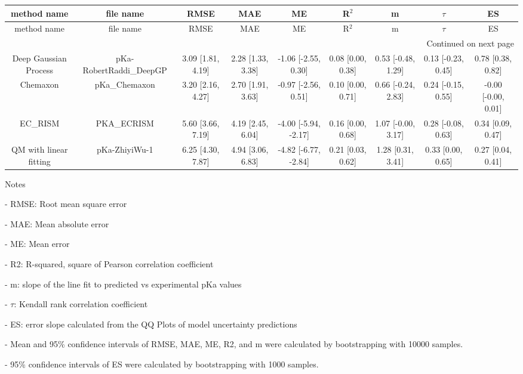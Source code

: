 \documentclass{article}
\begin{document}
\begin{center}
\scriptsize
\begin{longtable}{|ccccccccc|}
\toprule
           method name &               file name &              RMSE &               MAE &                   ME &             R$^2$ &                  m &             $\tau$ &                  ES \\
\midrule
\endfirsthead

\toprule
           method name &               file name &              RMSE &               MAE &                   ME &             R$^2$ &                  m &             $\tau$ &                  ES \\
\midrule
\endhead
\midrule
\multicolumn{9}{r}{{Continued on next page}} \\
\midrule
\endfoot

\bottomrule
\endlastfoot
 Deep Gaussian Process & pKa-RobertRaddi\_DeepGP & 3.09 [1.81, 4.19] & 2.28 [1.33, 3.38] &  -1.06 [-2.55, 0.30] & 0.08 [0.00, 0.38] & 0.53 [-0.48, 1.29] & 0.13 [-0.23, 0.45] &   0.78 [0.38, 0.82] \\
              Chemaxon &           pKa\_Chemaxon & 3.20 [2.16, 4.27] & 2.70 [1.91, 3.63] &  -0.97 [-2.56, 0.51] & 0.10 [0.00, 0.71] & 0.66 [-0.24, 2.83] & 0.24 [-0.15, 0.55] & -0.00 [-0.00, 0.01] \\
               EC_RISM &             PKA\_ECRISM & 5.60 [3.66, 7.19] & 4.19 [2.45, 6.04] & -4.00 [-5.94, -2.17] & 0.16 [0.00, 0.68] & 1.07 [-0.00, 3.17] & 0.28 [-0.08, 0.63] &   0.34 [0.09, 0.47] \\
QM with linear fitting &           pKa-ZhiyiWu-1 & 6.25 [4.30, 7.87] & 4.94 [3.06, 6.83] & -4.82 [-6.77, -2.84] & 0.21 [0.03, 0.62] &  1.28 [0.31, 3.41] &  0.33 [0.00, 0.65] &   0.27 [0.04, 0.41] \\
\end{longtable}
\end{center}

Notes

- RMSE: Root mean square error

- MAE: Mean absolute error

- ME: Mean error

- R2: R-squared, square of Pearson correlation coefficient

- m: slope of the line fit to predicted vs experimental pKa values

- $\tau$:  Kendall rank correlation coefficient

- ES: error slope calculated from the QQ Plots of model uncertainty predictions

- Mean and 95\% confidence intervals of RMSE, MAE, ME, R2, and m were calculated by bootstrapping with 10000 samples.

- 95\% confidence intervals of ES were calculated by bootstrapping with 1000 samples.\end{document}
\end{document}
